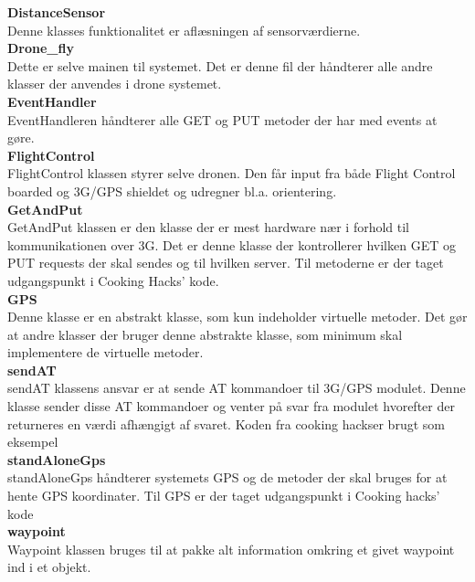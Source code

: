 \textbf{DistanceSensor}\\
Denne klasses funktionalitet er aflæsningen af sensorværdierne. \\ 

\textbf{Drone\_fly}\\
Dette er selve mainen til systemet. Det er denne fil der håndterer alle andre klasser der anvendes i drone systemet. \\ 

\textbf{EventHandler}\\
EventHandleren håndterer alle GET og PUT metoder der har med events at gøre. \\ 

\textbf{FlightControl}\\
FlightControl klassen styrer selve dronen. Den får input fra både Flight Control boarded og 3G/GPS shieldet og udregner bl.a. orientering. \\

\textbf{GetAndPut}\\
GetAndPut klassen er den klasse der er mest hardware nær i forhold til kommunikationen over 3G. Det er denne klasse der kontrollerer hvilken GET og PUT requests der skal sendes og til hvilken server. Til metoderne er der taget udgangspunkt i Cooking Hacks' kode\protect\footnotemark.\\ 

\textbf{GPS}\\
Denne klasse er en abstrakt klasse, som kun indeholder virtuelle metoder. Det gør at andre klasser der bruger denne abstrakte klasse, som minimum skal implementere de virtuelle metoder. \\ 

\textbf{sendAT}\\
sendAT klassens ansvar er at sende AT kommandoer til 3G/GPS modulet. Denne klasse sender disse AT kommandoer og venter på svar fra modulet hvorefter der returneres en værdi afhængigt af svaret. Koden fra cooking hacks\protect\footnotemark er brugt som eksempel\\ 

\textbf{standAloneGps}\\
standAloneGps håndterer systemets GPS og de metoder der skal bruges for at hente GPS koordinater. Til GPS er der taget udgangspunkt i Cooking hacks' kode\protect\footnotemark \\ 

\textbf{waypoint}\\
Waypoint klassen bruges til at pakke alt information omkring et givet waypoint ind i et objekt.\\ 

